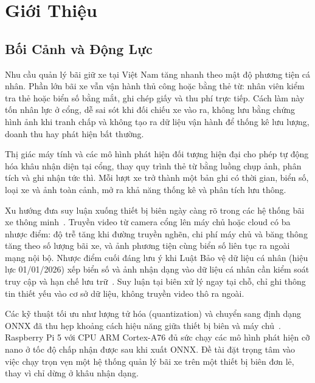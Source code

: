 \chapter{Giới Thiệu}
\label{ch:gioithieu}

\section{Bối Cảnh và Động Lực}

Nhu cầu quản lý bãi giữ xe tại Việt Nam tăng nhanh theo mật độ phương tiện cá nhân.
Phần lớn bãi xe vẫn vận hành thủ công hoặc bằng thẻ từ: nhân viên kiểm tra thẻ hoặc biển số bằng mắt, ghi chép giấy và thu
phí trực tiếp. Cách làm này tốn nhân lực ở cổng, dễ sai sót khi đối chiếu xe vào ra,
không lưu bằng chứng hình ảnh khi tranh chấp và không tạo ra dữ liệu vận hành để thống
kê lưu lượng, doanh thu hay phát hiện bất thường.

Thị giác máy tính và các mô hình phát hiện đối tượng hiện đại cho phép tự động hóa
khâu nhận diện tại cổng, thay quy trình thẻ từ bằng luồng chụp ảnh, phân tích và ghi
nhận tức thì. Mỗi lượt xe trở thành một bản ghi có thời gian, biển số, loại xe và ảnh
toàn cảnh, mở ra khả năng thống kê và phân tích lưu thông.

Xu hướng đưa suy luận xuống thiết bị biên ngày càng rõ trong các hệ thống bãi xe thông
minh~\autocite{pradhan2025iotparking,arukonda2026smartparking,rani2024ips}. Truyền video
từ camera cổng lên máy chủ hoặc cloud có ba nhược điểm: độ trễ tăng khi đường truyền
nghẽn, chi phí máy chủ và băng thông tăng theo số lượng bãi xe, và ảnh phương tiện cùng
biển số liên tục ra ngoài mạng nội bộ. Nhược điểm cuối đáng lưu ý khi Luật Bảo vệ dữ liệu
cá nhân (hiệu lực 01/01/2026) xếp biển số và ảnh nhận dạng vào dữ liệu cá nhân cần kiểm
soát truy cập và hạn chế lưu trữ~\autocite{vn2025lutbvdlcn}. Suy luận tại biên xử lý ngay
tại chỗ, chỉ ghi thông tin thiết yếu vào cơ sở dữ liệu, không truyền video thô ra ngoài.

Các kỹ thuật tối ưu như lượng tử hóa (quantization) và chuyển sang định dạng ONNX đã
thu hẹp khoảng cách hiệu năng giữa thiết bị biên và máy
chủ~\autocite{mdpi2026sbcbenchmark,sonnara2025lightedge}. Raspberry Pi 5 với CPU ARM
Cortex-A76 đủ sức chạy các mô hình phát hiện cỡ nano ở tốc độ chấp nhận được sau khi
xuất ONNX. Đề tài đặt trọng tâm vào việc chạy trọn vẹn một hệ thống quản lý bãi xe
trên một thiết bị biên đơn lẻ, thay vì chỉ dừng ở khâu nhận dạng.

